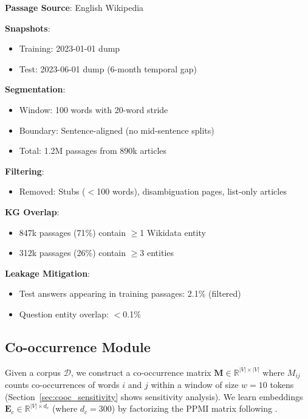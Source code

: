 \documentclass[10pt,twocolumn]{article}
\begin{document}
\textbf{Passage Source}: English Wikipedia

\textbf{Snapshots}:
\begin{itemize}
    \item Training: 2023-01-01 dump
    \item Test: 2023-06-01 dump (6-month temporal gap)
\end{itemize}

\textbf{Segmentation}:
\begin{itemize}
    \item Window: 100 words with 20-word stride
    \item Boundary: Sentence-aligned (no mid-sentence splits)
    \item Total: 1.2M passages from 890k articles
\end{itemize}

\textbf{Filtering}:
\begin{itemize}
    \item Removed: Stubs ($<$100 words), disambiguation pages, list-only articles
\end{itemize}

\textbf{KG Overlap}:
\begin{itemize}
    \item 847k passages (71\%) contain $\geq$1 Wikidata entity
    \item 312k passages (26\%) contain $\geq$3 entities
\end{itemize}

\textbf{Leakage Mitigation}:
\begin{itemize}
    \item Test answers appearing in training passages: 2.1\% (filtered)
    \item Question entity overlap: $<$0.1\%
\end{itemize}


\subsection{Co-occurrence Module}

Given a corpus $\mathcal{D}$, we construct a co-occurrence matrix $\mathbf{M} \in \mathbb{R}^{|V| \times |V|}$ where $M_{ij}$ counts co-occurrences of words $i$ and $j$ within a window of size $w=10$ tokens (Section~\ref{sec:cooc_sensitivity} shows sensitivity analysis). We learn embeddings $\mathbf{E}_c \in \mathbb{R}^{|V| \times d_c}$ (where $d_c=300$) by factorizing the PPMI matrix following \cite{pennington2014glove}.
\end{document}
